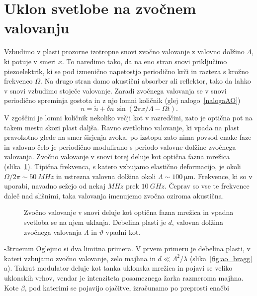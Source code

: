 \section{Uklon svetlobe na zvočnem valovanju}
Vzbudimo v plasti prozorne izotropne snovi zvočno valovanje z valovno dolžino $\Lambda$, 
ki potuje v smeri $x$. To naredimo tako, da na eno stran snovi priključimo piezoelektrik, 
ki se pod izmenično napetostjo periodično krči in razteza s krožno frekvenco $\Omega$.
Na drugo stran damo akustični absorber ali reflektor, tako da lahko 
v snovi vzbudimo stoječe valovanje. 
Zaradi zvočnega valovanja se v snovi periodično spreminja gostota in 
z njo lomni količnik (glej nalogo~\ref{nalogaAO})
\begin{equation}
n = \tilde{n} + \delta n \,\sin \left(2\pi x/\Lambda- \Omega t\right).
\end{equation}
V zgoščini je lomni količnik nekoliko večji kot v razredčini, zato je optična pot na takem mestu
skozi plast daljša. Ravno svetlobno valovanje, ki vpada na plast pravokotno glede
na smer širjenja zvoka, po izstopu zato nima povsod enake faze in valovno čelo 
je periodično modulirano s periodo 
valovne dolžine zvočnega valovanja. Zvočno valovanje v snovi torej deluje kot 
optična fazna mrežica (slika~\ref{fig:ao}). Tipična frekvenca, s katero vzbujamo elastično
deformacijo, je okoli $\Omega/2\pi \sim 50~\si{MHz}$ in ustrezna valovna dolžina okoli 
$\Lambda \sim 100~\si{\micro\metre}$. Frekvence, ki so v uporabi, navadno sežejo od 
nekaj $\si{MHz}$ prek $10~\si{GHz}$. Čeprav so vse te frekvence
daleč nad slišnimi, taka valovanja imenujemo zvočna oziroma akustična. 
\begin{figure}[ht]
\centering
\def\svgwidth{50truemm} 

\caption{Zvočno valovanje v snovi deluje kot optična fazna mrežica in vpadna svetloba 
se na njem uklanja. Debelina plasti je $d$, valovna dolžina zvočnega valovanja $\Lambda$
in $\vartheta$ vpadni kot.}
\label{fig:ao}
\end{figure}
\vglue-3truemm
Oglejmo si dva limitna primera. V prvem primeru je debelina plasti, 
v kateri vzbujamo zvočno valovanje, zelo majhna in 
$d \ll \Lambda^2/\lambda$ (slika~\ref{fig:ao_bragg}\,a).
Takrat modulator deluje kot tanka uklonska mrežica in pojavi se veliko 
uklonskih vrhov, vendar je intenziteta posameznega žarka razmeroma majhna. 
Kote $\beta$, pod katerimi se pojavijo ojačitve, izračunamo po preprosti enačbi
